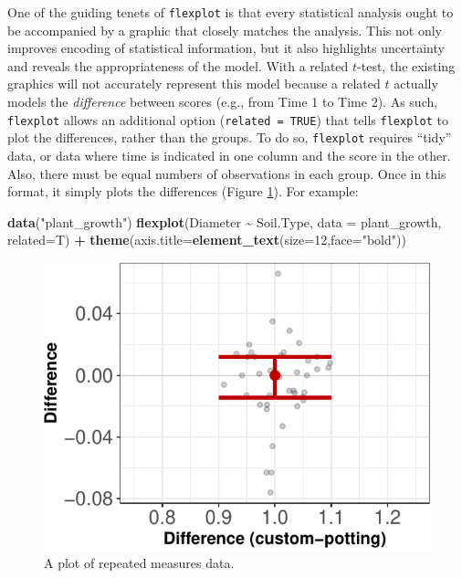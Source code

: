 \documentclass[
  man]{apa6}
\newenvironment{Shaded}{\begin{snugshade}}{\end{snugshade}}
\newcommand{\DataTypeTok}[1]{\textcolor[rgb]{0.13,0.29,0.53}{#1}}
\newcommand{\DecValTok}[1]{\textcolor[rgb]{0.00,0.00,0.81}{#1}}
\newcommand{\KeywordTok}[1]{\textcolor[rgb]{0.13,0.29,0.53}{\textbf{#1}}}
\newcommand{\NormalTok}[1]{#1}
\newcommand{\OperatorTok}[1]{\textcolor[rgb]{0.81,0.36,0.00}{\textbf{#1}}}
\newcommand{\StringTok}[1]{\textcolor[rgb]{0.31,0.60,0.02}{#1}}
\begin{document}
One of the guiding tenets of \texttt{flexplot} is that every statistical analysis ought to be accompanied by a graphic that closely matches the analysis. This not only improves encoding of statistical information, but it also highlights uncertainty and reveals the appropriateness of the model. With a related \(t\)-test, the existing graphics will not accurately represent this model because a related \(t\) actually models the \emph{difference} between scores (e.g., from Time 1 to Time 2). As such, \texttt{flexplot} allows an additional option (\texttt{related\ =\ TRUE}) that tells \texttt{flexplot} to plot the differences, rather than the groups. To do so, \texttt{flexplot} requires ``tidy'' data, or data where time is indicated in one column and the score in the other. Also, there must be equal numbers of observations in each group. Once in this format, it simply plots the differences (Figure \ref{fig:plant}). For example:

\small

\begin{Shaded}
\begin{Highlighting}[]
\KeywordTok{data}\NormalTok{(}\StringTok{"plant\_growth"}\NormalTok{)}
\KeywordTok{flexplot}\NormalTok{(Diameter }\OperatorTok{\textasciitilde{}}\StringTok{ }\NormalTok{Soil.Type, }\DataTypeTok{data =}\NormalTok{ plant\_growth, }\DataTypeTok{related=}\NormalTok{T) }\OperatorTok{+}
\StringTok{  }\KeywordTok{theme}\NormalTok{(}\DataTypeTok{axis.title=}\KeywordTok{element\_text}\NormalTok{(}\DataTypeTok{size=}\DecValTok{12}\NormalTok{,}\DataTypeTok{face=}\StringTok{"bold"}\NormalTok{))}
\end{Highlighting}
\end{Shaded}

\begin{figure}
\centering
\includegraphics{flexplot_psychmeth_files/figure-latex/plant-1.pdf}
\caption{\label{fig:plant}A plot of repeated measures data.\label{fig:plant}}
\end{figure}
\end{document}
